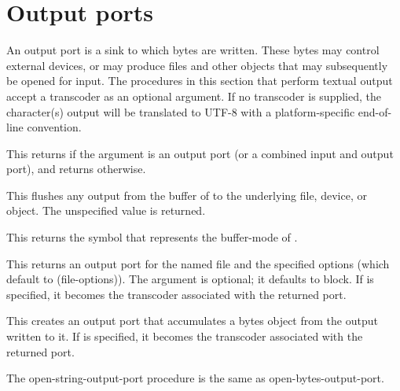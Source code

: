 \section{Output ports}

An output port is a sink to which bytes are written. These bytes may control
external devices, or may produce files and other objects that may
subsequently be opened for input.  The procedures in this section
that perform
textual output accept a transcoder as an optional argument.  If no
transcoder is supplied, the character(s) output will be translated to
UTF-8 with a platform-specific end-of-line convention.

\begin{entry}{%
}
   
This returns \schtrue{} if the argument is an output port (or a
combined input and output port), and returns \schfalse{} otherwise.
\end{entry}   

\begin{entry}{%
}
   
This flushes any output from the buffer of  to the
underlying file, device, or object. The unspecified value is returned.
\end{entry}

\begin{entry}{%
}
   
This returns the symbol that represents the buffer-mode of
.
\end{entry}

\begin{entry}{%
}

This returns an output port for the named file and the specified
options (which default to {\cf (file-options)}). The 
argument is optional; it defaults to {\cf block}.  If 
is specified, it becomes the transcoder associated with the returned
port.
\end{entry}   

\begin{entry}{%
}

This creates an output port that accumulates a bytes object from the
output written to it.  If  is specified, it becomes
the transcoder associated with the returned port.

The {\cf open-string-output-port} procedure is the same as {\cf
  open-bytes-output-port}.
\end{entry}

